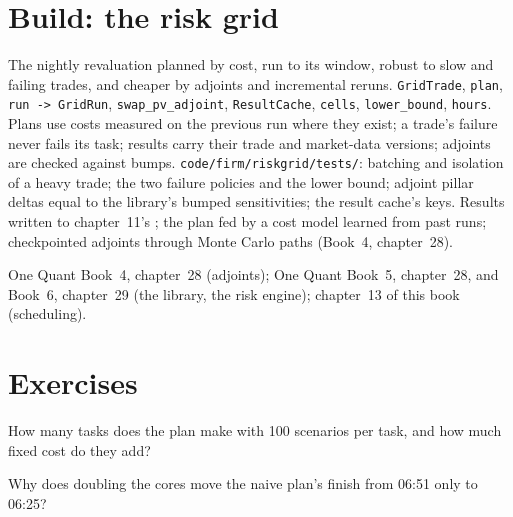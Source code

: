 \section{Build: the risk grid}\label{bld:pl:the-risk-grid:riskgrid}

\begin{build}
 The nightly revaluation planned by cost, run to its window, robust to slow and failing trades, and cheaper by adjoints and
incremental reruns.
 \texttt{GridTrade}, \texttt{plan}, \texttt{run -> GridRun}, \texttt{swap\_pv\_adjoint}, \texttt{ResultCache},
\texttt{cells}, \texttt{lower\_bound}, \texttt{hours}.
 Plans use costs measured on the previous run where they exist; a trade's failure never fails its task; results carry their trade
and market-data versions; adjoints are checked against bumps.
 \texttt{code/firm/riskgrid/tests/}: batching and isolation of a heavy trade; the two failure policies and the lower
bound; adjoint pillar deltas equal to the library's bumped sensitivities; the result cache's keys.
 Results written to chapter~11's ; the plan fed by a cost model learned from past runs; checkpointed adjoints
through Monte Carlo paths (Book~4, chapter~28).
\end{build}

\begin{omsources}
\item One Quant Book~4, chapter~28 (adjoints); One Quant Book~5, chapter~28, and Book~6, chapter~29 (the library, the risk engine); chapter~13 of this book (scheduling).
\end{omsources}

\section{Exercises}

\begin{exercise}[$\star$]\label{exo:pl:the-risk-grid:1}
How many tasks does the plan make with 100 scenarios per task, and how much fixed cost do they add?
\end{exercise}

\begin{exercise}[$\star$]\label{exo:pl:the-risk-grid:2}
Why does doubling the cores move the naive plan's finish from 06:51 only to 06:25?
\end{exercise}

